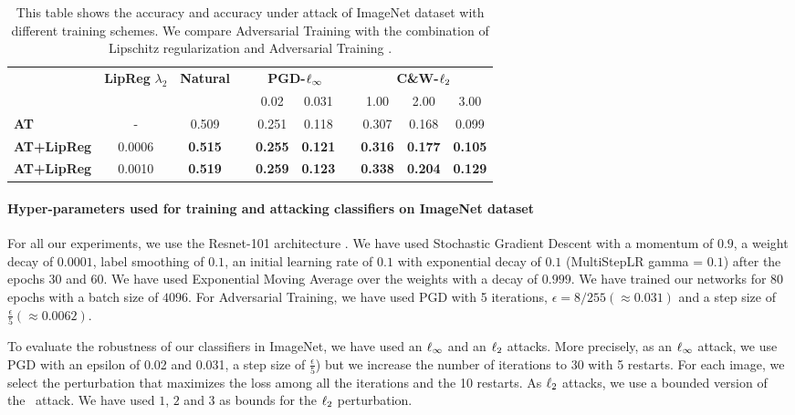 \begin{table}[htb]
  \centering
  \caption{This table shows the accuracy and accuracy under attack of ImageNet dataset with different training schemes. We compare Adversarial Training with the combination of Lipschitz regularization and Adversarial Training \cite{madry2018towards}. }
    \begin{tabular}{lccccccccc}
    \toprule
      & \multicolumn{1}{c}{\multirow{2}[4]{*}{\textbf{LipReg} $\lambda_2$}} & \multicolumn{1}{c}{\multirow{2}[4]{*}{\textbf{Natural}}} &   & \multicolumn{2}{c}{\textbf{PGD-}$\ell_\infty$} &   & \multicolumn{3}{c}{\textbf{C\&W-}$\ell_2$} \\
\cmidrule{5-6}\cmidrule{8-10}      &   &   &   & \multicolumn{1}{c}{0.02} & \multicolumn{1}{c}{0.031} &   & \multicolumn{1}{c}{1.00} & \multicolumn{1}{c}{2.00} & \multicolumn{1}{c}{3.00} \\
    \midrule
    \textbf{AT} & \multicolumn{1}{c}{-} & 0.509 &   & 0.251 & 0.118 &   & 0.307 & 0.168 & 0.099 \\
    \textbf{AT+LipReg} & 0.0006 & \textbf{0.515} &   & \textbf{0.255} & \textbf{0.121} &   & \textbf{0.316} & \textbf{0.177} & \textbf{0.105} \\
    \textbf{AT+LipReg} & 0.0010 & \textbf{0.519} &   & \textbf{0.259} & \textbf{0.123} &   & \textbf{0.338} & \textbf{0.204} & \textbf{0.129} \\
    \bottomrule
    \end{tabular}%
\end{table}%


\paragraph{Hyper-parameters used for training and attacking classifiers on ImageNet dataset}

For all our experiments, we use the Resnet-101 architecture \cite{he2016deep}. We have used Stochastic Gradient Descent with a momentum of $0.9$, a weight decay of $0.0001$, label smoothing of $0.1$, an initial learning rate of $0.1$ with exponential decay of $0.1$ (MultiStepLR gamma = $0.1$) after the epochs $30$ and $60$. We have used Exponential Moving Average over the weights with a decay of $0.999$. We have trained our networks for 80 epochs with a batch size of $4096$. For Adversarial Training, we have used PGD with 5 iterations, $\epsilon = 8/255 (\approx 0.031)$ and a step size of $\frac{\epsilon}{5} (\approx 0.0062)$. 

To evaluate the robustness of our classifiers in ImageNet, we have used an $\ell_\infty$ and an $\ell_2$ attacks. More precisely, as an $\ell_\infty$ attack, we use PGD with an epsilon of 0.02 and 0.031, a step size of $\textstyle \frac{\epsilon}{5}$) but we increase the number of iterations to 30 with 5 restarts. For each image, we select the perturbation that maximizes the loss among all the iterations and the 10 restarts. As $\ell_2$ attacks, we use a bounded version of the~\cite{carlini2017towards} attack. We have used $1$, $2$ and $3$ as bounds for the $\ell_2$ perturbation. 


